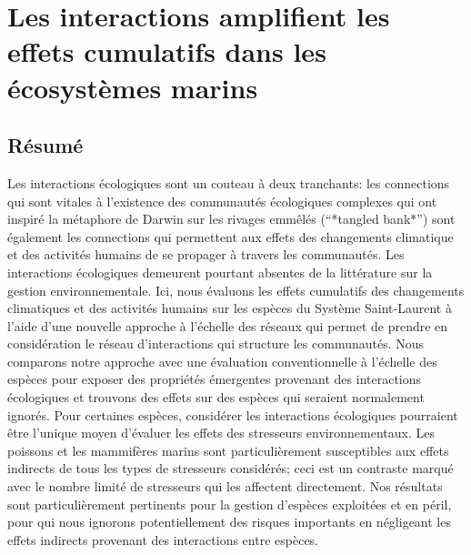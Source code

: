 \chapter{Les interactions amplifient les effets cumulatifs dans les écosystèmes marins}
\label{chap5}

\section{Résumé}

Les interactions écologiques sont un couteau à deux tranchants: les connections qui sont vitales à l’existence des communautés écologiques complexes qui ont inspiré la métaphore de Darwin sur les rivages emmêlés (“*tangled bank*”) sont également les connections qui permettent aux effets des changements climatique et des activités humains de se propager à travers les communautés. Les interactions écologiques demeurent pourtant absentes de la littérature sur la gestion environnementale. Ici, nous évaluons les effets cumulatifs des changements climatiques et des activités humains sur les espèces du Système Saint-Laurent à l’aide d’une nouvelle approche à l’échelle des réseaux qui permet de prendre en considération le réseau d’interactions qui structure les communautés. Nous comparons notre approche avec une évaluation conventionnelle à l’échelle des espèces pour exposer des propriétés émergentes provenant des interactions écologiques et trouvons des effets sur des espèces qui seraient normalement ignorés. Pour certaines espèces, considérer les interactions écologiques pourraient être l’unique moyen d’évaluer les effets des stresseurs environnementaux. Les poissons et les mammifères marins sont particulièrement susceptibles aux effets indirects de tous les types de stresseurs considérés; ceci est un contraste marqué avec le nombre limité de stresseurs qui les affectent directement. Nos résultats sont particulièrement pertinents pour la gestion d’espèces exploitées et en péril, pour qui nous ignorons potentiellement des risques importants en négligeant les effets indirects provenant des interactions entre espèces.

